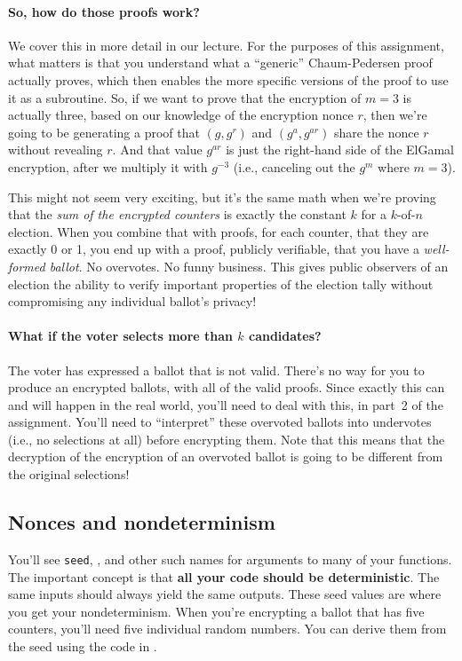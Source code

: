 \paragraph{So, how do those proofs work?}
We cover this in more detail in our lecture. For the purposes of this assignment,
what matters is that you understand what a ``generic'' Chaum-Pedersen
proof actually proves, which then enables the more specific versions of the proof
to use it as a subroutine. So, if we want to prove that the encryption
of $m=3$ is actually three, based on our knowledge of the encryption
nonce $r$, then we're going to be generating a proof that $(g, g^r)$
and $(g^a, g^{ar})$ share the nonce $r$ without revealing $r$. And that
value $g^{ar}$ is just the right-hand side of the ElGamal
encryption, after we multiply it with $g^{-3}$ (i.e., canceling
out the $g^m$ where $m=3$).

This might not seem very exciting, but it's the same math when we're
proving that the {\em sum of the encrypted counters} is exactly the
constant $k$ for a $k$-of-$n$ election. When you combine that with
proofs, for each counter, that they are exactly 0 or 1, you end up
with a proof, publicly verifiable, that you have a {\em well-formed
  ballot}. No overvotes. No funny business. This gives public
observers of an election the ability to verify important properties of
the election tally without compromising any individual ballot's privacy!

\paragraph{What if the voter selects more than $k$ candidates?}
The voter has expressed a ballot that is not valid. There's no way for
you to produce an encrypted ballots, with all of the valid proofs.
Since exactly this can and will happen in the real world, you'll need
to deal with this, in part~2 of the assignment. You'll need to
``interpret'' these overvoted ballots into undervotes (i.e., no
selections at all) before encrypting them. Note that this means that
the decryption of the encryption of an overvoted ballot is going to be
different from the original selections!

\subsection{Nonces and nondeterminism}
\label{sec:nonces}
You'll see {\tt seed}, , and other
such names for arguments to many of your functions. The important
concept is that {\bf all your code should be deterministic}. The same
inputs should always yield the same outputs. These seed values are
where you get your nondeterminism. When you're encrypting a ballot
that has five counters, you'll need five individual random numbers.
You can derive them from the seed using the code in . 

